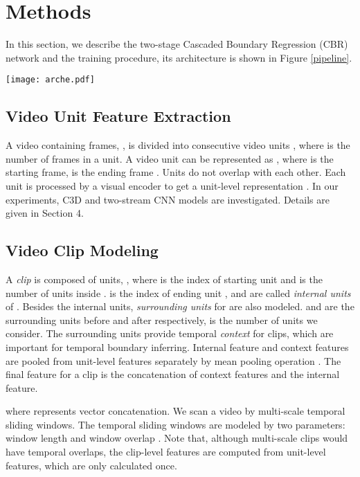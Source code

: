 \documentclass{bmvc2k}
\begin{document}
\section{Methods}
In this section, we describe the two-stage Cascaded Boundary Regression (CBR) network and the training procedure, its architecture is shown in Figure \ref{pipeline}.

\begin{figure*}[]
\centering
\texttt{[image: arche.pdf]}
\caption{ Architecture of two-stage action detection pipeline with Cascaded Boundary Regression (CBR)}
\label{pipeline}
\end{figure*}

\subsection{Video Unit Feature Extraction} \label{sec:unit processing}
A video  containing  frames, , is divided into  consecutive video units , where  is the number of frames in a unit. A video unit can be represented as , where  is the starting frame,  is the ending frame . Units do not overlap with each other. Each unit is processed by a visual encoder  to get a unit-level representation . In our experiments, C3D \cite{tran2015learning} and two-stream CNN models \cite{simonyan2014two} are investigated. Details are given in Section 4. 

\subsection{Video Clip Modeling}
A \emph{clip}  is composed of units, , where  is the index of starting unit and  is the number of units inside .  is the index of ending unit , and  are called \emph{internal units} of . Besides the internal units, \emph{surrounding units} for  are also modeled.  and   are the surrounding units before and after  respectively,  is the number of units we consider. The surrounding units provide temporal \emph{context} for clips, which are important for temporal boundary inferring. Internal feature and context features are pooled from unit-level features separately by mean pooling operation . The final feature  for a clip is the concatenation of context features and the internal feature.


where  represents vector concatenation. We scan a video by multi-scale temporal sliding windows. The temporal sliding windows are modeled by two parameters: window length  and window overlap . Note that, although multi-scale clips would have temporal overlaps, the clip-level features are computed from unit-level features, which are only calculated once. 
\end{document}
